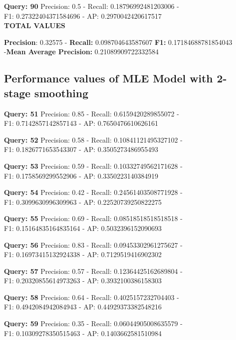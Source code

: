 \documentclass[a4paper, 11pt]{article}
\begin{document}
\textbf{Query: 90}
Precision: 0.5 - Recall: 0.18796992481203006 - \\
F1: 0.27322404371584696 - AP:  0.2970042420617517\\

\textbf{TOTAL VALUES}

\textbf{Precision}: 0.32575 - \textbf{Recall:} 0.098704643587607 \textbf{F1:} 0.17184688781854043 \\
-\textbf{Mean Average Precision:} 0.21089909722332584

\subsection{Performance values of MLE Model with 2-stage smoothing}

\textbf{Query: 51}
Precision: 0.85 - Recall: 0.6159420289855072 - \\
F1: 0.7142857142857143 - AP:  0.7650476610626161

\textbf{Query: 52}
Precision: 0.58 - Recall: 0.10841121495327102 - \\
F1: 0.1826771653543307 - AP:  0.3505273486955493

\textbf{Query: 53}
Precision: 0.59 - Recall: 0.10332749562171628 - \\
F1: 0.1758569299552906 - AP:  0.3350223140384919

\textbf{Query: 54}
Precision: 0.42 - Recall: 0.24561403508771928 - \\
F1: 0.3099630996309963 - AP:  0.22520739250822275

\textbf{Query: 55}
Precision: 0.69 - Recall: 0.08518518518518518 - \\
F1: 0.15164835164835164 - AP:  0.5032396152090693

\textbf{Query: 56}
Precision: 0.83 - Recall: 0.09453302961275627 - \\
F1: 0.16973415132924338 - AP:  0.7129519416902302

\textbf{Query: 57}
Precision: 0.57 - Recall: 0.12364425162689804 - \\
F1: 0.20320855614973263 - AP:  0.3932100386158303

\textbf{Query: 58}
Precision: 0.64 - Recall: 0.4025157232704403 - \\
F1: 0.4942084942084943 - AP:  0.44929373382548216

\textbf{Query: 59}
Precision: 0.35 - Recall: 0.06044905008635579 - \\
F1: 0.10309278350515463 - AP:  0.1403662581510984
\end{document}
